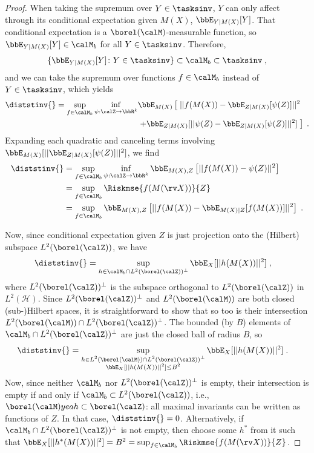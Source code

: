 \documentclass[final]{article}
\begin{document}
\begin{proof}
	When taking the supremum over $Y\in\tasksinv$, $Y$ can only affect \disttextinv{} through its conditional expectation given $M(X)$, $\bbE_{Y|M(X)}[Y]$. That conditional expectation is a $\borel(\calM)$-measurable function, so $\bbE_{Y|M(X)}[Y] \in \calM_b$ for all $Y\in\tasksinv$. Therefore,
	\begin{align*}
		\{ \bbE_{Y|M(X)}[Y] \colon Y \in \tasksinv \} \subset \calM_b \subset \tasksinv \;,
	\end{align*}
	and we can take the supremum over functions $f \in \calM_b$ instead of $Y \in \tasksinv$, which yields
	\begin{align*}
		\diststinv{} = \sup_{f \in \calM_b} \inf_{\psi : \calZ\to\bbR^k} &
			\bbE_{M(X)}\left[\; ||f(M(X)) - \bbE_{Z|M(X)}[\psi(Z)] ||^2 \right. \\
      & \left. + \bbE_{Z|M(X)}[|| \psi(Z) - \bbE_{Z|M(X)}[\psi(Z)]||^2 ] \;\right] \;. \nonumber
	\end{align*}
	Expanding each quadratic and canceling terms involving $\bbE_{M(X)}[||\bbE_{Z|M(X)}[\psi(Z)]||^2]$, we find
	\begin{align}
		\diststinv{} &= \sup_{f \in \calM_b} \inf_{\psi : \calZ\to\bbR^k} 
			\bbE_{M(X),Z}\left[ || f(M(X)) - \psi(Z) ||^2 \right] \\
			& = \sup_{f \in \calM_b}  \Riskmse{f(M(\rv X))}{Z} \\
			& = \sup_{f \in \calM_b} \bbE_{M(X),Z}\left[ || f(M(X)) - \bbE_{M(X)|Z}[f(M(X))] ||^2 \right] \;.
	\end{align}
	
	Now, since conditional expectation given $Z$ is just projection onto the (Hilbert) subspace $L^2(\borel(\calZ))$, we have
	\begin{align*}
	    \diststinv{} &= \sup_{h \in \calM_b \cap L^2(\borel(\calZ))^{\perp}} \bbE_X[ ||h(M(X))||^2 ] \;,
	\end{align*}
	where $L^2(\borel(\calZ))^{\perp}$ is the subspace orthogonal to $L^2(\borel(\calZ))$ in $L^2(\mathcal{H})$. Since $L^2(\borel(\calZ))^{\perp}$ and $L^2(\borel(\calM))$ are both closed (sub-)Hilbert spaces, it is straightforward to show that so too is their intersection $L^2(\borel(\calM)) \cap L^2(\borel(\calZ))^{\perp}$. The bounded (by $B$) elements of $\calM_b \cap L^2(\borel(\calZ))^{\perp}$ are just the closed ball of radius $B$, so 
	\begin{align*}
	    \diststinv{} &= \sup_{\substack{h \in L^2(\borel(\calM)) \cap L^2(\borel(\calZ))^{\perp} \\ \bbE_X[ ||h(M(X))||^2 ] \leq B^2}} \bbE_X[ ||h(M(X))||^2 ] \;.
	\end{align*}
	Now, since neither $\calM_b$ nor $L^2(\borel(\calZ))^{\perp}$ is empty, their intersection is empty if and only if $\calM_b \subset L^2(\borel(\calZ))$, i.e., $\borel(\calM)yeah  \subset \borel(\calZ)$: all maximal invariants can be written as functions of $Z$. In that case, $\diststinv{}=0$. Alternatively, if $\calM_b \cap L^2(\borel(\calZ))^{\perp}$ is not empty, then choose some $h^*$ from it such that $\bbE_X[||h^*(M(X))||^2] = B^2 = \sup_{f \in \calM_b} \Riskmse{f(M(\rv X))}{Z}$.
	



\end{proof}
\end{document}
